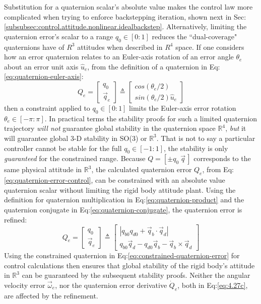 Substitution for a quaternion scalar's absolute value makes the control law more complicated when trying to enforce backstepping iteration, shown next in Sec:\ref{subsubsec:control.attitude.nonlinear.idealbackstep}. Alternatively, limiting the quaternion error's scalar to a range $q_0\in[0:1]$ reduces the ``dual-coverage" quaternions have of $R^3$ attitudes when described in $R^4$ space. If one considers how an error quaternion relates to an Euler-axis rotation of an error angle $\theta_e$ about an error unit axis $\hat{u}_e$, from the definition of a quaternion in Eq:\ref{eq:quaternion-euler-axis}:
\begin{equation}
Q_e=\begin{bmatrix}
q_0\\
\vec{q}_e
\end{bmatrix}
\triangleq
\begin{bmatrix}
cos(\theta_e/2)\\
sin(\theta_e/2)\hat{u}_e
\end{bmatrix}
\end{equation}
then a constraint applied to $q_0\in[0:1]$ limits the Euler-axis error rotation $\theta_e\in[-\pi:\pi]$. In practical terms the stability proofs for such a limited quaternion trajectory \emph{will not} guarantee global stability in the quaternion space $\mathbb{R}^4$, \emph{but} it will guarantee global 3-D stability in SO(3) or $\mathbb{R}^3$. That is not to say a particular controller cannot be stable for the full $q_0\in[-1:1]$, the stability is only \emph{guaranteed} for the constrained range. Because $Q=[\pm q_0~\vec{q}\hspace{2pt}]$ corresponds to the same physical attitude in $\mathbb{R}^{3}$, the calculated quaternion error $Q_e$, from Eq:\ref{eq:quaternion-error-control}, can be constrained with an absolute value quaternion scalar without limiting the rigid body attitude plant. Using the definition for quaternion multiplication in Eq:\ref{eq:quaternion-product} and the quaternion conjugate in Eq:\ref{eq:quaternion-conjugate}, the quaternion error is refined:
\begin{equation}\label{eq:constrained-quaternion-error}
Q_e = \begin{bmatrix}
q_0\\
\vec{q}_e
\end{bmatrix}
\triangleq
\begin{bmatrix}
|q_{b0}q_{d0}+\vec{q}_b\cdot\vec{q}_d|\\
q_{b0}\vec{q}_d-q_{d0}\vec{q}_b-\vec{q}_b\times\vec{q}_d
\end{bmatrix}
\end{equation}
Using the constrained quaternion in Eq:\ref{eq:constrained-quaternion-error} for control calculations then ensures that global stability of the rigid body's attitude in $\mathbb{R}^3$ can be guaranteed by the subsequent stability proofs. Neither the angular velocity error $\vec{\omega}_e$, nor the quaternion error derivative $\dot{Q}_e$, both in Eq:\ref{eq:4.27c}, are affected by the refinement.
